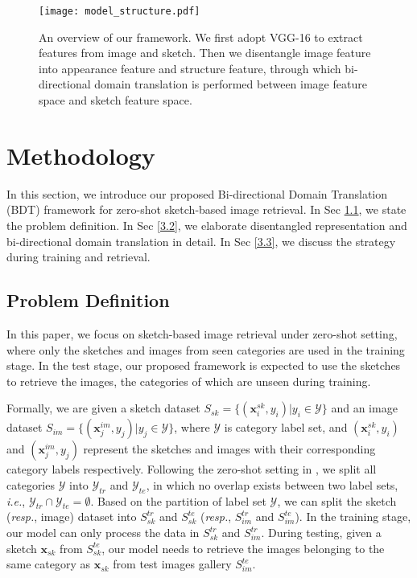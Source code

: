 \documentclass[10pt,twocolumn,letterpaper]{article}
\begin{document}
\begin{figure*}
\centering
\texttt{[image: model\_structure.pdf]}   
\caption{An overview of our framework. We first adopt VGG-16 \cite{simonyan2014very} to extract features from image and sketch. Then we disentangle image feature into appearance feature and structure feature, through which bi-directional domain translation is performed between image feature space and sketch feature space.}
\label{fig:structure}
\vspace{-10pt}
\end{figure*}

\section{Methodology}
In this section, we introduce our proposed Bi-directional Domain Translation (BDT) framework for zero-shot sketch-based image retrieval. In Sec \ref{3.1}, we state the problem definition. In Sec \ref{3.2}, we elaborate disentangled representation and bi-directional domain translation in detail. In Sec \ref{3.3}, we discuss the strategy during training and retrieval.

\subsection{Problem Definition} \label{3.1}
In this paper, we focus on sketch-based image retrieval under zero-shot setting, where only the sketches and images from seen categories are used in the training stage. 
In the test stage, our proposed framework is expected to use the sketches to retrieve the images, the categories of which are unseen during training.

Formally, we are given a sketch dataset $S_{sk}=\{(\mathbf{x}_i^{sk}, y_i)|y_i \in \mathcal{Y}\}$ and an image dataset $S_{im}=\{(\mathbf{x}_j^{im}, y_j) | y_j \in \mathcal{Y}\}$, where $\mathcal{Y}$ is category label set, and $(\mathbf{x}_i^{sk}, y_i)$ and $(\mathbf{x}_j^{im}, y_j)$ represent the sketches and images with their corresponding category labels respectively.
Following the zero-shot setting in \cite{yelamarthi2018zero,wang2019stacked}, we split all categories $\mathcal{Y}$ into $\mathcal{Y}_{tr}$ and $\mathcal{Y}_{te}$, in which no overlap exists between two label sets, \emph{i.e.}, $\mathcal{Y}_{tr} \cap \mathcal{Y}_{te} = \emptyset$. 
Based on the partition of label set $\mathcal{Y}$, we can split the sketch (\emph{resp.}, image) dataset into $S^{tr}_{sk}$ and $S^{te}_{sk}$ (\emph{resp.}, $S^{tr}_{im}$ and $S^{te}_{im}$).
In the training stage, our model can only process the data in $S^{tr}_{sk}$ and $S_{im}^{tr}$. 
During testing, given a sketch $\mathbf{x}_{sk}$ from $S^{te}_{sk}$, our model needs to retrieve the images belonging to the same category as $\mathbf{x}_{sk}$ from test images gallery $S^{te}_{im}$.
\end{document}
